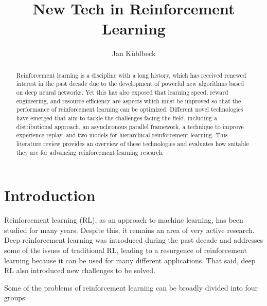 \documentclass[runningheads]{llncs}
\begin{document}
%
\title{New Tech in Reinforcement Learning}
%
%
\author{Jan Küblbeck}
%
%
\maketitle              %
%
\begin{abstract}
Reinforcement learning is a discipline with a long history, which has received renewed interest in the past decade due to the development of powerful new algorithms based on deep neural networks.
Yet this has also exposed that learning speed, reward engineering, and resource efficiency are aspects which must be improved so that the performance of reinforcement learning can be optimized.
Different novel technologies have emerged that aim to tackle the challenges facing the field, including a distributional approach, an asynchronous parallel framework, a technique to improve experience replay, and two models for hierarchical reinforcement learning.
This literature review provides an overview of these technologies and evaluates how suitable they are for advancing reinforcement learning research.

\end{abstract}
%
%
%
\section{Introduction}

Reinforcement learning (RL), as an approach to machine learning, has been studied for many years. Despite this, it remains an area of very active research. Deep reinforcement learning was introduced during the past decade and addresses some of the issues of traditional RL, leading to a resurgence of reinforcement learning because it can be used for many different applications. That said, deep RL also introduced new challenges to be solved.

Some of the problems of reinforcement learning can be broadly divided into four groups:
\end{document}
